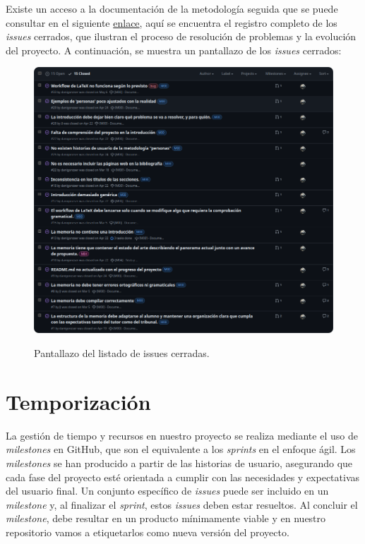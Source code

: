 Existe un acceso a la documentación de la metodología seguida que se puede consultar en el siguiente \href{https://github.com/danigonzser/proyecto-tfg/issues?q=is%3Aissue+is%3Aclosed}{enlace}, aquí se encuentra el registro completo de los \textit{issues} cerrados, que ilustran el proceso de resolución de problemas y la evolución del proyecto. A continuación, se muestra un pantallazo de los \textit{issues} cerrados:

\begin{figure}[H]
    \caption{Pantallazo del listado de issues cerradas.}
    \centering
    \vspace*{0.5cm}
    \includegraphics[scale=0.2]{figuras/listado_issues_cerradas.png}\label{fig:figuras/listado_issues_cerradas.png}
\end{figure}

\section{Temporización}

La gestión de tiempo y recursos en nuestro proyecto se realiza mediante el uso de \textit{milestones} en GitHub, que son el equivalente a los \textit{sprints} en el enfoque ágil. Los \textit{milestones} se han producido a partir de las historias de usuario, asegurando que cada fase del proyecto esté orientada a cumplir con las necesidades y expectativas del usuario final. Un conjunto específico de \textit{issues} puede ser incluido en un \textit{milestone} y, al finalizar el \textit{sprint}, estos \textit{issues} deben estar resueltos. Al concluir el \textit{milestone}, debe resultar en un producto mínimamente viable y en nuestro repositorio vamos a etiquetarlos como nueva versión del proyecto.

